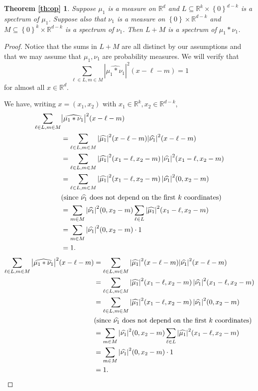 \documentclass[12pt,a4paper,intlimits,sumlimits]{amsart}
\theoremstyle{plain}
\newtheorem*{reptheorem}{Theorem \ref{th:op}}
\theoremstyle{definition}
\newcommand{\Abs}[1]{{\left|{#1}\right|}}
\newcommand{\Set}[1]{{\left\{{#1}\right\}}}
\newcommand{\RR}{{\mathbb R}}
\newcommand{\ft}[1]{\widehat{#1}}
\newcounter{rem}
\begin{document}
\begin{reptheorem}Suppose $\mu_1$ is a measure on $\RR^d$ and $L \subseteq \RR^k\times\Set{0}^{d-k}$ is a spectrum of $\mu_1$. Suppose also that $\nu_1$ is a measure on $\Set{0}\times\RR^{d-k}$ and $M \subseteq \Set{0}^k\times\RR^{d-k}$ is a spectrum of $\nu_1$.
Then $L+M$ is a spectrum of $\mu_1*\nu_1$.
\end{reptheorem}
\begin{proof} 
Notice that the sums in $L+M$ are all distinct by our assumptions and that we may assume that $\mu_1, \nu_1$ are probability measures. We will verify that
$$
\sum_{\ell\in L, m \in M} \Abs{\ft{\mu_1*\nu_1}}^2(x-\ell-m) = 1
$$
for almost all $x \in \RR^d$.

We have, writing $x=(x_1, x_2)$ with $x_1 \in \RR^k, x_2 \in \RR^{d-k}$,
\ifdefined\SMART
\begin{align*}
\sum_{\ell\in L, m \in M} &\Abs{\ft{\mu_1*\nu_1}}^2(x-\ell-m)\\
  &= \sum_{\ell\in L, m \in M} \Abs{\ft{\mu_1}}^2(x-\ell-m)  \Abs{\ft{\nu_1}}^2(x-\ell-m)\\
 &= \sum_{\ell\in L, m \in M} \Abs{\ft{\mu_1}}^2(x_1-\ell, x_2-m)
    \, \Abs{\ft{\nu_1}}^2(x_1-\ell, x_2-m)\\
 &= \sum_{\ell\in L, m \in M} \Abs{\ft{\mu_1}}^2(x_1-\ell, x_2-m)
    \, \Abs{\ft{\nu_1}}^2(0, x_2-m)\\
 &\vspace{5em}\text{(since $\ft{\nu_1}$ does not depend on the first $k$ coordinates)}\\
 &= \sum_{m \in M}  \Abs{\ft{\nu_1}}^2(0, x_2-m) 
      \sum_{\ell \in L} \Abs{\ft{\mu_1}}^2(x_1-\ell, x_2-m) \\
 &= \sum_{m \in M}  \Abs{\ft{\nu_1}}^2(0, x_2-m) \cdot 1\\
 &= 1.
\end{align*}
\else
\begin{align*}
\sum_{\ell\in L, m \in M} \Abs{\ft{\mu_1*\nu_1}}^2(x-\ell-m)
  &= \sum_{\ell\in L, m \in M} \Abs{\ft{\mu_1}}^2(x-\ell-m)  \Abs{\ft{\nu_1}}^2(x-\ell-m)\\
 &= \sum_{\ell\in L, m \in M} \Abs{\ft{\mu_1}}^2(x_1-\ell, x_2-m)
    \, \Abs{\ft{\nu_1}}^2(x_1-\ell, x_2-m)\\
 &= \sum_{\ell\in L, m \in M} \Abs{\ft{\mu_1}}^2(x_1-\ell, x_2-m)
    \, \Abs{\ft{\nu_1}}^2(0, x_2-m)\\
 &\vspace{5em}\text{(since $\ft{\nu_1}$ does not depend on the first $k$ coordinates)}\\
 &= \sum_{m \in M}  \Abs{\ft{\nu_1}}^2(0, x_2-m) 
      \sum_{\ell \in L} \Abs{\ft{\mu_1}}^2(x_1-\ell, x_2-m) \\
 &= \sum_{m \in M}  \Abs{\ft{\nu_1}}^2(0, x_2-m) \cdot 1\\
 &= 1.
\end{align*}
\fi

\end{proof}
\end{document}
